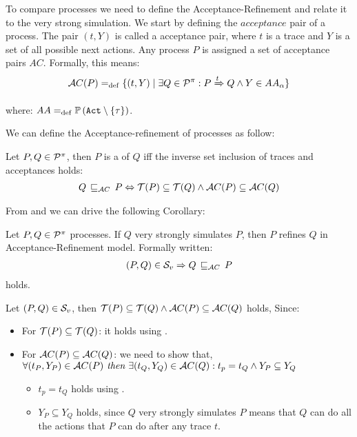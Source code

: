 To compare \picalc{} processes we need to define the Acceptance-Refinement and relate it to the very strong simulation. We start by defining the $acceptance$ pair of a process.
The pair $(t, Y)$ is called a acceptance pair, where $t$ is a trace and $Y$ is a set of all possible next actions. Any process
$P$ is assigned a set of acceptance pairs $AC$. Formally, this means:
\begin{align}
    \Accepatances[P] \define \{(t,Y) \mid \exists Q\in\procs: P \bigstep{t} Q \wedge Y\in AA_\alpha\}
\label{failure}
\end{align}

where: $AA \define \pom{\actions\setminus\set{\tau}}$.

We can define the Acceptance-refinement of \picalc{} processes as follow:

\begin{definition}
\label{def_failure_ref}
	Let $P,Q\in\mathcal P^{\pi}$, then $P$ is a  of $Q$ iff the inverse set inclusion of traces and acceptances holds:
\begin{align}
   Q \refiAC P \Leftrightarrow  \Traces[P]\subseteq\Traces[Q] \wedge \Accepatances[P]\subseteq\Accepatances[Q]
\end{align}
\end{definition}

From  and  we can drive the following Corollary: 

\begin{cor}
\label{cor_sim_acceptance_refinement}
Let $P,Q\in\mathcal P^{\pi}$ processes. If $Q$ very strongly simulates $P$, then $P$ refines $Q$ in Acceptance-Refinement model. Formally written:
\begin{align}
    (P,Q)\in{}\simuv \Rightarrow Q \refiAC P
   \label{acceptance_model}
\end{align}
holds.
\end{cor}%

\begin{prf}
Let $(P,Q)\in{}\mathcal{S}_v$, then $\Traces[P]\subseteq\Traces[Q] \wedge \Accepatances[P]\subseteq\Accepatances[Q]$ holds, Since:
\begin{itemize}
\item For $\Traces[P]\subseteq\Traces[Q]$: it holds using .
\item For $\Accepatances[P]\subseteq\Accepatances[Q]$: we need to show that,\\$\forall (t_P, Y_P) \in \Accepatances[P] \textit{ then } \exists (t_Q, Y_Q) \in \Accepatances[Q]: t_p = t_Q \wedge Y_P \subseteq Y_Q$
\begin{itemize}
\item $t_p = t_Q$ holds using .
\item $Y_P \subseteq Y_Q$ holds, since $Q$ very strongly simulates $P$ means that $Q$ can do all the actions that $P$ can do after any trace $t$.
\end{itemize}
\end{itemize}
\end{prf}
